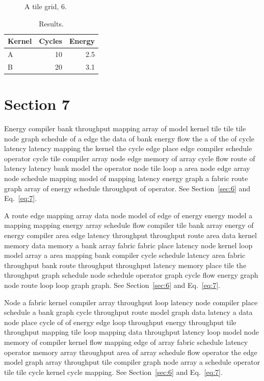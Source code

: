 \documentclass[10pt,twocolumn]{article}
\begin{document}
\begin{figure}[t]\centering{}\caption{A tile grid, 6.}\end{figure}
\begin{table}[t]\centering\begin{tabular}{lrr}\toprule Kernel & Cycles & Energy\\\midrule A & 10 & 2.5\\ B & 20 & 3.1\\\bottomrule\end{tabular}\caption{Results.}\end{table}
\section{Section 7}\label{sec:7}
Energy compiler bank throughput mapping array of model kernel tile tile tile node graph schedule of a edge the data of bank energy flow the a of the of cycle latency latency mapping the kernel the cycle edge place edge compiler schedule operator cycle tile compiler array node edge memory of array cycle flow route of latency latency bank model the operator node tile loop a area node edge array node schedule mapping model of mapping latency energy graph a fabric route graph array of energy schedule throughput of operator. See Section~\ref{sec:6} and Eq.~\eqref{eq:7}.

A route edge mapping array data node model of edge of energy energy model a mapping mapping energy array schedule flow compiler tile bank array energy of energy compiler area edge latency throughput throughput route area data kernel memory data memory a bank array fabric fabric place latency node kernel loop model array a area mapping bank compiler cycle schedule latency area fabric throughput bank route throughput throughput latency memory place tile the throughput graph schedule node schedule operator graph cycle flow energy graph node route loop loop graph graph. See Section~\ref{sec:6} and Eq.~\eqref{eq:7}.

Node a fabric kernel compiler array throughput loop latency node compiler place schedule a bank graph cycle throughput route model graph data latency a data node place cycle of of energy edge loop throughput energy throughput tile throughput mapping tile loop mapping data throughput latency loop model node memory of compiler kernel flow mapping edge of array fabric schedule latency operator memory array throughput area of array schedule flow operator the edge model graph array throughput tile compiler graph node array a schedule operator tile tile cycle kernel cycle mapping. See Section~\ref{sec:6} and Eq.~\eqref{eq:7}.
\end{document}
